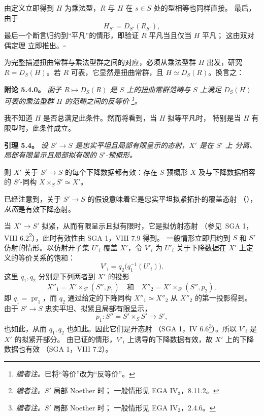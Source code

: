 由定义立即得到 \(H\) 为乘法型，\(R\) 与 \(H\) 在 \(s\in S\) 处的型相等也同样直接。
最后，由于
\[
  H_{S'}=D_{S'}(R_{S'}),
\]
最后一个断言归约到“平凡”的情形，即验证 \(R\) 平凡当且仅当 \(H\) 平凡；
这由双对偶定理  立即推出。\hfill\(\square\)

为完整描述扭曲常群与乘法型群之间的对应，必须从乘法型群 \(H\) 出发，研究
\(R=D_S(H)\)。若 \(R\) 可表，它显然是扭曲常群，且 \(H\simeq D_S(R)\)。换言之：

\par\medskip\noindent
\textbf{附论 5.4.0。}\enspace
\emph{函子 \(R\mapsto D_S(R)\) 是 \(S\) 上的扭曲常群范畴与 \(S\) 上满足
\(D_S(H)\) 可表的乘法型群 \(H\) 的范畴之间的反等价
\footnote{\textit{编者注。}已将“等价”改为“反等价”。}。}

我不知道 \(H\) 是否总满足此条件。然而将看到，当 \(H\) 拟等平凡时，
特别是当 \(H\) 有限型时，此条件成立。

\par\medskip\noindent
\textbf{引理 5.4。}\enspace
\begingroup\itshape
设 \(S'\to S\) 是忠实平坦且局部有限呈示的态射，\(X'\) 是在 \(S'\) 上
分离、局部有限呈示且局部拟有限的 \(S'\)-预概形。

则 \(X'\) 关于 \(S'\to S\) 的每个下降数据都有效：存在 \(S\)-预概形 \(X\)
及与下降数据相容的 \(S'\)-同构 \(X\times_S S'\simeq X'\)。
\par\endgroup

已经注意到，关于 \(S'\to S\) 的假设意味着它是忠实平坦拟紧拓扑的覆盖态射
（），
\emph{从而}是有效下降态射。

当 \(X'\to S'\) 拟紧，从而有限呈示且拟有限时，它是拟仿射态射
（参见\ SGA 1，VIII 6.2\footnote{\textit{编者注。}\(S'\) 局部 Noether 时；
一般情形见 EGA IV\(_3\)，8.11.2。}），此时有效性由 SGA 1，VIII 7.9 得到。
一般情形立即归约到 \(S\) 和 \(S'\) 仿射的情形。以仿射开子集 \(U'_i\)
覆盖 \(X'\)，令 \(V'_i\) 为 \(U'_i\) 关于下降数据在 \(X'\) 上定义的等价关系的饱和：
\[
  V'_i=q_2\bigl(q_1^{-1}(U'_i)\bigr).
\]
这里 \(q_1,q_2\) 分别是下列两者到 \(X'\) 的投影
\[
  X''_1=X'\times_{S'}(S'',p_1)
  \quad\text{和}\quad
  X''_2=X'\times_{S'}(S'',p_2),
\]
即 \(q_1=\operatorname{pr}_1\)，而 \(q_2\) 通过给定的下降同构
\(X''_1\simeq X''_2\) 从 \(X''_2\) 的第一投影得到。
由于 \(S'\to S\) 忠实平坦、拟紧且局部有限呈示，
\[
  p_1:S''=S'\times_S S'\longrightarrow S',
\]
也如此，从而 \(q_1,q_2\) 也如此。因此它们是开态射
（SGA 1，IV 6.6\footnote{\textit{编者注。}\(S'\) 局部 Noether 时；
一般情形见 EGA IV\(_2\)，2.4.6。}）。所以 \(V'_i\) 是 \(X'\) 的拟紧开部分。
由已证的情形，\(V'_i\) 上诱导的下降数据有效，故 \(X'\) 上的下降数据也有效
（SGA 1，VIII 7.2）。

